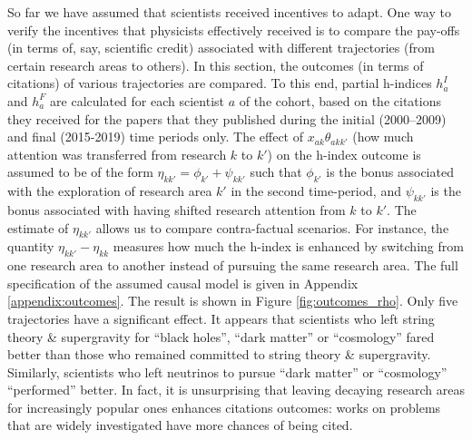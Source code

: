 \documentclass{article}
\begin{document}
So far we have assumed that scientists received incentives to adapt. One way to verify the incentives that physicists effectively received is to compare the pay-offs (in terms of, say, scientific credit) associated with different trajectories (from certain research areas to others). In this section, the outcomes (in terms of citations) of various trajectories are compared. To this end, partial h-indices $h_a^{I}$ and $h_a^{F}$ are calculated for each scientist $a$ of the cohort, based on the citations they received for the papers that they published during the initial (2000--2009) and final (2015-2019) time periods only. The effect of $x_{ak}\theta_{akk'}$ (how much attention was transferred from research $k$ to $k'$) on the h-index outcome is assumed to be of the form $\eta_{kk'} = \phi_{k'} + \psi_{kk'}$ such that $\phi_{k'}$ is the bonus associated with the exploration of research area $k'$ in the second time-period, and $\psi_{kk'}$ is the bonus associated with having shifted research attention from $k$ to $k'$. The estimate of $\eta_{kk'}$ allows us to compare contra-factual scenarios. For instance, the quantity $\eta_{kk'}-\eta_{kk}$ measures how much the h-index is enhanced by switching from one research area to another instead of pursuing the same research area. The full specification of the assumed causal model is given in Appendix \ref{appendix:outcomes}. The result is shown in Figure \ref{fig:outcomes_rho}. Only five trajectories have a significant effect. It appears that scientists who left string theory \& supergravity for ``black holes'', ``dark matter'' or ``cosmology'' fared better than those who remained committed to string theory \& supergravity. Similarly, scientists who left neutrinos to pursue ``dark matter'' or ``cosmology'' ``performed'' better. In fact, it is unsurprising that leaving decaying research areas for increasingly popular ones enhances citations outcomes: works on problems that are widely investigated have more chances of being cited.
\end{document}
